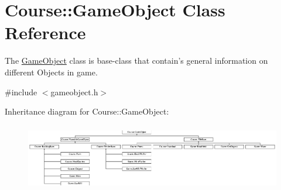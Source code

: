 \hypertarget{classCourse_1_1GameObject}{\section{Course\-:\-:Game\-Object Class Reference}
\label{classCourse_1_1GameObject}
}


The \hyperlink{classCourse_1_1GameObject}{Game\-Object} class is base-\/class that contain's general information on different Objects in game.  




{\ttfamily \#include $<$gameobject.\-h$>$}

Inheritance diagram for Course\-:\-:Game\-Object\-:\begin{figure}[H]
\begin{center}
\leavevmode
\includegraphics[height=2.916667cm]{classCourse_1_1GameObject}
\end{center}
\end{figure}
